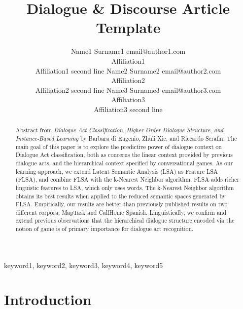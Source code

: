 \documentclass[twoside,11pt]{article}
\begin{document}
\title{Dialogue \& Discourse Article Template}

\author{\name Name1 Surname1 \email email@author1.com \\
       \addr Affiliation1\\
       Affiliation1 second line
       \AND
       \name Name2 Surname2 \email email@author2.com \\
       \addr Affiliation2\\
       Affiliation2 second line
       \AND 
       \name Name3 Surname3  \email email@author3.com\\
       \addr Affiliation3\\
       Affiliation3 second line}


\maketitle

\begin{abstract}%
 Abstract from {\em Dialogue Act Classification, Higher Order Dialogue Structure, and
 Instance-Based Learning} by Barbara di Eugenio, Zhuli Xie, and Riccardo Serafin: 
  The main goal of this paper is to explore the predictive power of
  dialogue context on Dialogue Act classification, both as concerns 
  the linear context 
  provided by previous dialogue acts, and the hierarchical context 
  specified  by conversational
  games. As our learning approach, we  extend Latent Semantic
  Analysis (LSA) as Feature LSA (FLSA), and combine FLSA with
  the k-Nearest Neighbor algorithm. FLSA adds
  richer linguistic features to LSA, which only uses words.   
   The k-Nearest Neighbor algorithm obtains its best results when
  applied to the reduced semantic spaces generated by FLSA.
  Empirically, our results are better than previously published
  results on two different corpora, MapTask and CallHome
  Spanish. Linguistically, we confirm and extend previous observations
  that the hierarchical dialogue structure encoded via the notion of
  game is of primary importance for dialogue act recognition.
\end{abstract}

\begin{keywords}
keyword1, keyword2, keyword3, keyword4, keyword5
\end{keywords}



\section{Introduction}



\end{document}
